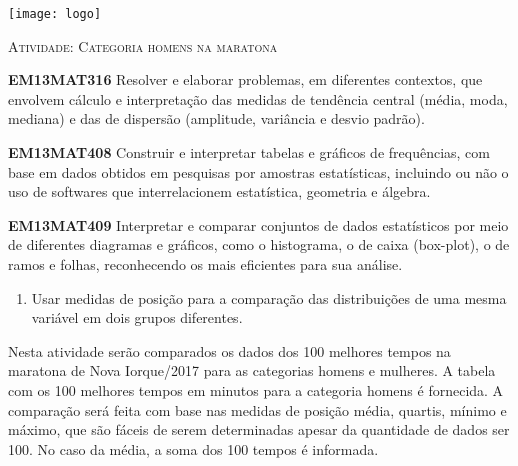 \documentclass[10 pt,usenames,dvipsnames, oneside]{article}
\begin{document}
\begin{center}
  \begin{minipage}[l]{3cm}
\texttt{[image: logo]}    
\end{minipage}\hfill
\begin{minipage}[r]{.8\textwidth}
 {\Large \scshape Atividade: Categoria homens na maratona}  
\end{minipage}
\end{center}
\vspace{.2cm}

\ifdefined\prof
\begin{objetivos}
\item \textbf{EM13MAT316} Resolver e elaborar problemas, em diferentes contextos, que envolvem cálculo e
interpretação das medidas de tendência central (média, moda, mediana) e das de dispersão
(amplitude, variância e desvio padrão).
\item \textbf{EM13MAT408} Construir e interpretar tabelas e gráficos de frequências, com base em dados obtidos em pesquisas por amostras estatísticas, incluindo ou não o uso de softwares que interrelacionem estatística, geometria e álgebra.
\item \textbf{EM13MAT409} Interpretar e comparar conjuntos de dados estatísticos por meio de diferentes diagramas e gráficos, como o histograma, o de caixa (box-plot), o de ramos e folhas, reconhecendo os mais eficientes para sua análise.
\end{objetivos}

\begin{goals}
\begin{enumerate}
\item Usar medidas de posição para a comparação das distribuições de uma mesma variável em dois grupos diferentes.
\end{enumerate}

\tcblower

Nesta atividade serão comparados os dados dos 100 melhores tempos na maratona de Nova Iorque/2017 para as categorias homens e mulheres. A tabela com os 100 melhores tempos em minutos para a categoria homens é fornecida. A comparação será feita com base nas medidas de posição média, quartis, mínimo e máximo, que são fáceis de serem determinadas apesar da quantidade de dados ser 100. No caso da média, a soma dos 100 tempos é informada.
\end{goals}
\end{document}

